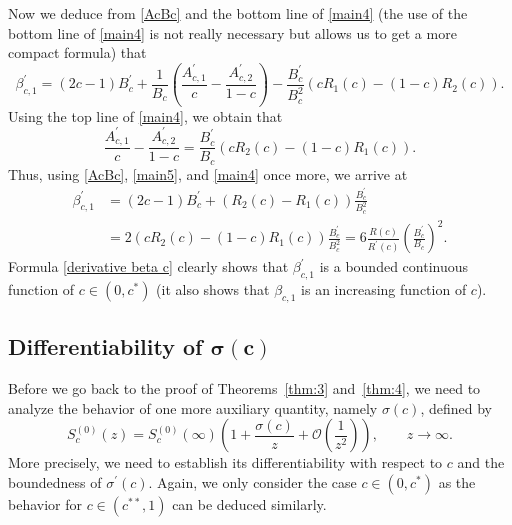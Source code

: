 \documentclass[10pt,a4paper]{amsart}
\numberwithin{equation}{section}
\begin{document}
Now we deduce from \eqref{AcBc} and the bottom line of \eqref{main4} (the use of the bottom line of \eqref{main4} is not really necessary but allows us to get a more compact formula) that
\[
\beta_{c,1}^\prime = (2c-1)B_c^\prime + \frac 1{B_c}\left( \frac{A_{c,1}^\prime}c - \frac{A_{c,2}^\prime}{1-c} \right) - \frac{B_c^\prime}{B_c^2}(cR_1(c)-(1-c)R_2(c)).
\]
Using the top line of \eqref{main4}, we obtain that
\[
\frac{A_{c,1}^\prime}c - \frac{A_{c,2}^\prime}{1-c} = \frac{B_c^\prime}{B_c} ( c R_2(c) - (1-c)R_1(c) ).
\]
Thus, using \eqref{AcBc}, \eqref{main5}, and \eqref{main4} once more, we arrive at
\begin{align}
\beta_{c,1}^\prime & = (2c-1)B_c^\prime + ( R_2(c) - R_1(c))\frac{B_c^\prime}{B_c^2} \nonumber \\
& = 2 ( cR_2(c) - (1-c)R_1(c))\frac{B_c^\prime}{B_c^2} = 6\frac{R(c)}{R^\prime(c)} \left( \frac{B_c^\prime}{B_c} \right)^2.
\label{derivative beta c}
\end{align}
Formula \eqref{derivative beta c} clearly shows that $ \beta_{c,1}^\prime $ is a bounded continuous function of $ c\in(0,c^*) $ (it also shows that $ \beta_{c,1} $ is an increasing function of $ c $).

\subsection[Differentiability of sigma(c)]{Differentiability of $\boldsymbol{\sigma(c)} $}

Before we go back to the proof of Theorems~\ref{thm:3} and~\ref{thm:4}, we need to analyze the behavior of one more auxiliary quantity, namely $ \sigma(c) $, defined by
\begin{equation}
\label{def sigma c}
S_c^{(0)}(z) = S_c^{(0)}(\infty) \left( 1 + \frac{\sigma(c)}z + \mathcal O\left(\frac1{z^2}\right) \right), \qquad z\to\infty.
\end{equation}
More precisely, we need to establish its differentiability with respect to $ c $ and the boundedness of $ \sigma^\prime(c) $. Again, we only consider the case $ c\in(0,c^*) $ as the behavior for $ c\in(c^{**},1) $ can be deduced similarly.
\end{document}
